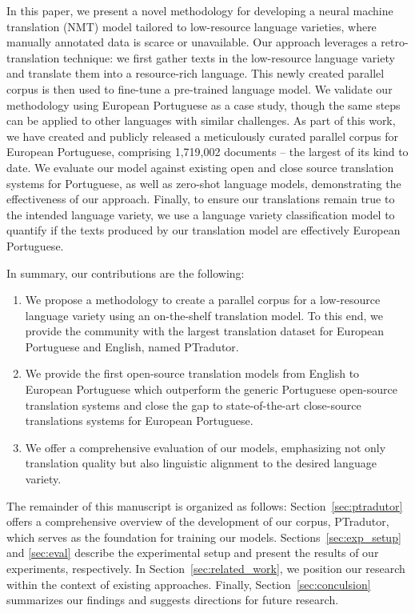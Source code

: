 In this paper, we present a novel methodology for developing a neural machine translation (NMT) model tailored to low-resource language varieties, where manually annotated data is scarce or unavailable. Our approach leverages a retro-translation technique: we first gather texts in the low-resource language variety and translate them into a resource-rich language. This newly created parallel corpus is then used to fine-tune a pre-trained language model. We validate our methodology using European Portuguese as a case study, though the same steps can be applied to other languages with similar challenges. As part of this work, we have created and publicly released a meticulously curated parallel corpus for European Portuguese, comprising 1,719,002 documents -- the largest of its kind to date. We evaluate our model against existing open and close source translation systems for Portuguese, as well as zero-shot language models, demonstrating the effectiveness of our approach. Finally, to ensure our translations remain true to the intended language variety, we use a language variety classification model to quantify if the texts produced by our translation model are effectively European Portuguese. 

In summary, our contributions are the following:

\begin{enumerate}

  \item We propose a methodology to create a parallel corpus for a low-resource language variety using an on-the-shelf translation model. 
  To this end, we provide the community with the largest translation dataset for European Portuguese and English, named PTradutor.
  
  \item We provide the first  open-source translation models from English to European Portuguese which  outperform the generic Portuguese open-source translation systems and close the gap to state-of-the-art close-source translations systems for European Portuguese.
  
  \item We offer a comprehensive evaluation of our models, emphasizing not only translation quality but also linguistic alignment to the desired language variety.

\end{enumerate}

The remainder of this manuscript is organized as follows: Section~\ref{sec:ptradutor} offers a comprehensive overview of the development of our corpus, PTradutor, which serves as the foundation for training our models. Sections~\ref{sec:exp_setup} and \ref{sec:eval} describe the experimental setup and present the results of our experiments, respectively. In Section~\ref{sec:related_work}, we position our research within the context of existing approaches. Finally, Section~\ref{sec:conculsion} summarizes our findings and suggests directions for future research.
